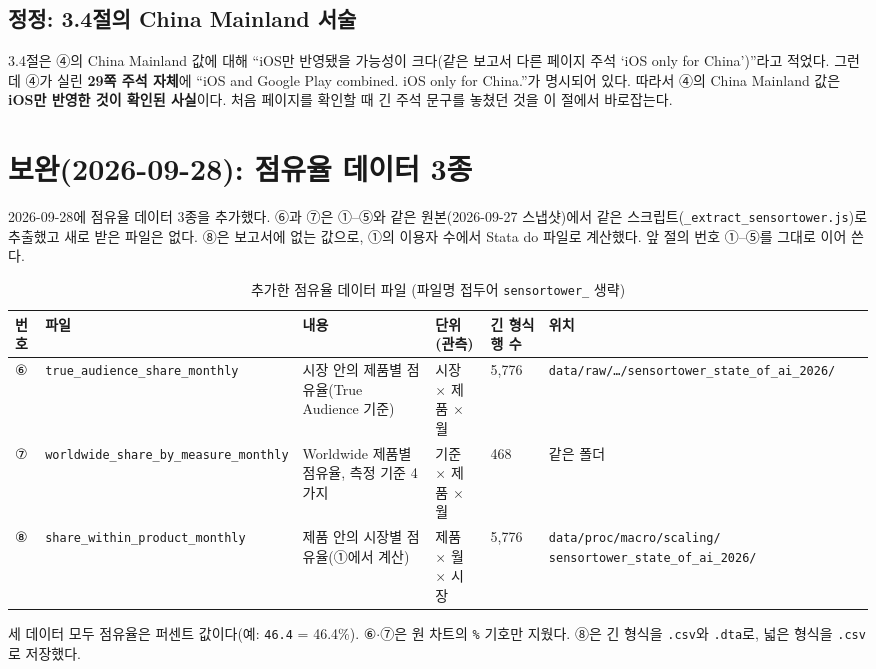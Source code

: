 \documentclass[11pt]{article}
\begin{document}
\subsection{정정: 3.4절의 China Mainland 서술}

3.4절은 ④의 China Mainland 값에 대해 ``iOS만 반영됐을 가능성이 크다(같은 보고서 다른 페이지 주석 `iOS only for China')''라고 적었다. 그런데 ④가 실린 \textbf{29쪽 주석 자체}에 ``iOS and Google Play combined. iOS only for China.''가 명시되어 있다. 따라서 ④의 China Mainland 값은 \textbf{iOS만 반영한 것이 확인된 사실}이다. 처음 페이지를 확인할 때 긴 주석 문구를 놓쳤던 것을 이 절에서 바로잡는다.

\section{보완(2026-09-28): 점유율 데이터 3종}

2026-09-28에 점유율 데이터 3종을 추가했다. ⑥과 ⑦은 ①--⑤와 같은 원본(2026-09-27 스냅샷)에서 같은 스크립트(\texttt{\_extract\_sensortower.js})로 추출했고 새로 받은 파일은 없다. ⑧은 보고서에 없는 값으로, ①의 이용자 수에서 Stata do 파일로 계산했다. 앞 절의 번호 ①--⑤를 그대로 이어 쓴다.

\begin{longtable}{L{0.8cm}L{3.9cm}L{3.6cm}L{2.2cm}L{1.3cm}L{3.2cm}}
\caption{추가한 점유율 데이터 파일 (파일명 접두어 \texttt{sensortower\_} 생략)}\label{tab:sharefiles}\\
\toprule
번호 & 파일 & 내용 & 단위(관측) & 긴 형식 행 수 & 위치 \\
\midrule
\endhead
⑥ & \texttt{true\_audience\_share\_monthly} & 시장 안의 제품별 점유율(True Audience 기준) & 시장 $\times$ 제품 $\times$ 월 & 5,776 & \texttt{data/raw/\ldots/sensortower\_state\_of\_ai\_2026/} \\
⑦ & \texttt{worldwide\_share\_by\_measure\_monthly} & Worldwide 제품별 점유율, 측정 기준 4가지 & 기준 $\times$ 제품 $\times$ 월 & 468 & 같은 폴더 \\
⑧ & \texttt{share\_within\_product\_monthly} & 제품 안의 시장별 점유율(①에서 계산) & 제품 $\times$ 월 $\times$ 시장 & 5,776 & \texttt{data/proc/macro/scaling/ sensortower\_state\_of\_ai\_2026/} \\
\bottomrule
\end{longtable}

세 데이터 모두 점유율은 퍼센트 값이다(예: \texttt{46.4} = 46.4\%). ⑥$\cdot$⑦은 원 차트의 \texttt{\%} 기호만 지웠다. ⑧은 긴 형식을 \texttt{.csv}와 \texttt{.dta}로, 넓은 형식을 \texttt{.csv}로 저장했다.
\end{document}
